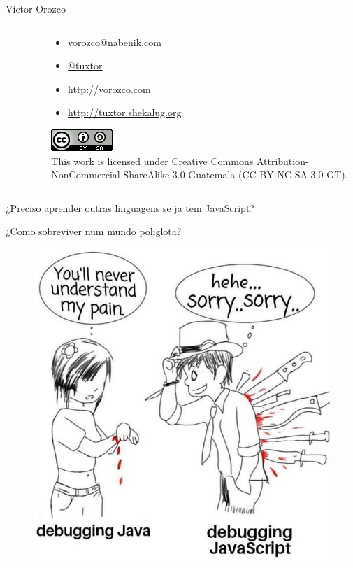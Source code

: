 \documentclass[aspectratio=169]{beamer}
\begin{document}
\begin{frame}{Víctor Orozco}
\begin{columns}[T]
\begin{column}[T]{4cm}
\begin{figure}
            \end{figure}
        \end{column}
        \begin{column}[T]{6cm} %
            \begin{itemize}
                \item vorozco@nabenik.com
                \item \href{https://twitter.com/tuxtor}{@tuxtor}
                \item \href{http://vorozco.com}{http://vorozco.com}
                \item \href{http://tuxtor.shekalug.org}{http://tuxtor.shekalug.org}
            \end{itemize}
            \begin{center}
                \includegraphics[width=0.1\linewidth]{Images/cclogo}
                \\
                This work is licensed under Creative Commons Attribution-NonCommercial-ShareAlike 3.0 Guatemala (CC BY-NC-SA 3.0 GT).
            \end{center}
        \end{column}
    \end{columns}
\end{frame}

\begin{frame}
    \huge ¿Preciso aprender outras linguagens se ja tem JavaScript?
\end{frame}

\begin{frame}
    \huge ¿Como sobreviver num mundo poliglota?
\end{frame}

\begin{frame}
    \begin{figure}
        \centering
        \includegraphics[width=0.5\linewidth]{Images/javavsjs}
    \end{figure}
\end{frame}
\end{document}

